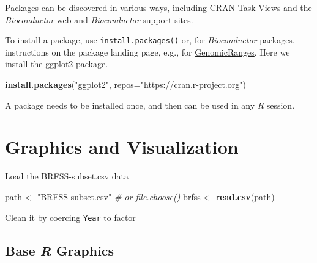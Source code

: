 \documentclass[]{article}
\newenvironment{Shaded}{\begin{snugshade}}{\end{snugshade}}
\newcommand{\KeywordTok}[1]{\textcolor[rgb]{0.13,0.29,0.53}{\textbf{#1}}}
\newcommand{\DataTypeTok}[1]{\textcolor[rgb]{0.13,0.29,0.53}{#1}}
\newcommand{\StringTok}[1]{\textcolor[rgb]{0.31,0.60,0.02}{#1}}
\newcommand{\CommentTok}[1]{\textcolor[rgb]{0.56,0.35,0.01}{\textit{#1}}}
\newcommand{\OperatorTok}[1]{\textcolor[rgb]{0.81,0.36,0.00}{\textbf{#1}}}
\newcommand{\NormalTok}[1]{#1}
\theoremstyle{definition}
\theoremstyle{definition}
\theoremstyle{remark}
\begin{document}
Packages can be discovered in various ways, including
\href{https://cran.r-project.org/web/views/}{CRAN Task Views} and the
\href{https://bioconductor.org}{\emph{Bioconductor} web} and
\href{https://support.bioconductor.org}{\emph{Bioconductor} support}
sites.

To install a package, use \texttt{install.packages()} or, for
\emph{Bioconductor} packages, instructions on the package landing page,
e.g., for
\href{https://bioconductor.org/packages/GenomicRanges}{GenomicRanges}.
Here we install the
\href{https://cran.r-project.org/package=ggplot2}{ggplot2} package.

\begin{Shaded}
\begin{Highlighting}[]
\KeywordTok{install.packages}\NormalTok{(}\StringTok{"ggplot2"}\NormalTok{, }\DataTypeTok{repos=}\StringTok{"https://cran.r-project.org"}\NormalTok{)}
\end{Highlighting}
\end{Shaded}

A package needs to be installed once, and then can be used in any
\emph{R} session.

\section{Graphics and Visualization}\label{graphics-and-visualization}

Load the BRFSS-subset.csv data

\begin{Shaded}
\begin{Highlighting}[]
\NormalTok{path <-}\StringTok{ "BRFSS-subset.csv"}   \CommentTok{# or file.choose()}
\NormalTok{brfss <-}\StringTok{ }\KeywordTok{read.csv}\NormalTok{(path)}
\end{Highlighting}
\end{Shaded}

Clean it by coercing \texttt{Year} to factor

\begin{Shaded}
\end{Shaded}

\subsection{\texorpdfstring{Base \emph{R}
Graphics}{Base R Graphics}}\label{base-r-graphics}
\end{document}
